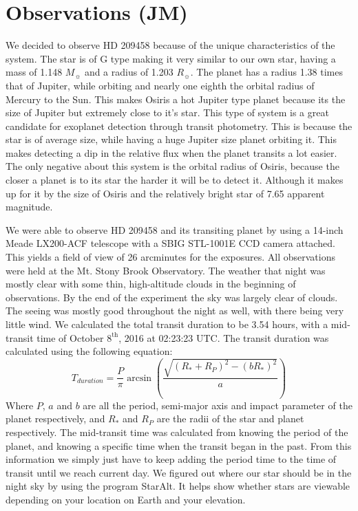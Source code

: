 \documentclass{aastex}
\begin{document}
\section{Observations (JM)}
We decided to observe HD 209458 because of the unique characteristics of the system. The star is of G type making it very similar to our own star, having a mass of 1.148 $M_\sun$ and a radius of 1.203 $R_\sun$. The planet has a radius 1.38 times that of Jupiter, while orbiting and nearly one eighth the orbital radius of Mercury to the Sun. This makes Osiris a hot Jupiter type planet because its the size of Jupiter but extremely close to it's star. This type of system is a great candidate for exoplanet detection through transit photometry. This is because the star is of average size, while having a huge Jupiter size planet orbiting it. This makes detecting a dip in the relative flux when the planet transits a lot easier. The only negative about this system is the orbital radius of Osiris, because the closer a planet is to its star the harder it will be to detect it. Although it makes up for it by the size of Osiris and the relatively bright star of 7.65 apparent magnitude.

We were able to observe HD 209458 and its transiting planet by using a 14-inch Meade LX200-ACF telescope with a SBIG STL-1001E CCD camera attached. This yields a field of view of 26 arcminutes for the exposures. All observations were held at the Mt. Stony Brook Observatory. The weather that night was mostly clear with some thin, high-altitude clouds in the beginning of observations. By the end of the experiment the sky was largely clear of clouds. The seeing was mostly good throughout the night as well, with there being very little wind. We calculated the total transit duration to be 3.54 hours, with a mid-transit time of October $8^{\text{th}}$, 2016 at 02:23:23 UTC. The transit duration was calculated using the following equation:
\begin{equation}
T_{duration} = \frac{P}{\pi}\arcsin\left(\frac{\sqrt{(R_*+R_P)^{2}-(bR_*)^{2}}}{a}\right)
\end{equation}
Where $P$, $a$ and $b$ are all the period, semi-major axis and impact parameter of the planet respectively, and $R_*$ and $R_P$ are the radii of the star and planet respectively. The mid-transit time was calculated from knowing the period of the planet, and knowing a specific time when the transit began in the past. From this information we simply just have to keep adding the period time to the time of transit until we reach current day. We figured out where our star should be in the night sky by using the program StarAlt. It helps show whether stars are viewable depending on your location on Earth and your elevation.
\end{document}
